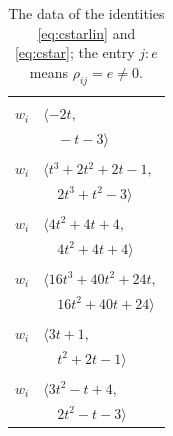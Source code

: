 \documentclass[11pt]{article}
\begin{document}
\begingroup\scriptsize
\setlength{\LTcapwidth}{\textwidth}
\begin{longtable}{@{}ll@{}}
\caption{The data of the identities \eqref{eq:cstarlin} and \eqref{eq:cstar}; the entry $j{:}e$ means $\rho_{ij}=e\neq0$.}\label{tab:cstar}\\
\hline\endfirsthead\hline\endhead\hline\endfoot
\multicolumn{2}{@{}p{0.97\textwidth}@{}}{$i=0$, $D_i=1$, $\rho_{ij}$: $22{:}2, \allowbreak 39{:}1, \allowbreak 40{:}1$}\\
$w_i$ & $\langle -2t,$\\
 & $\quad -t-3\rangle$\\
\addlinespace[2pt]
\multicolumn{2}{@{}p{0.97\textwidth}@{}}{$i=1$, $D_i=1$, $\rho_{ij}$: $21{:}1, \allowbreak 25{:}1, \allowbreak 26{:}2, \allowbreak 27{:}1, \allowbreak 37{:}2, \allowbreak 38{:}1, \allowbreak 42{:}1$}\\
$w_i$ & $\langle t^{3}+2t^{2}+2t-1,$\\
 & $\quad 2t^{3}+t^{2}-3\rangle$\\
\addlinespace[2pt]
\multicolumn{2}{@{}p{0.97\textwidth}@{}}{$i=2$, $D_i=1$, $\rho_{ij}$: $28{:}1, \allowbreak 35{:}1, \allowbreak 37{:}1, \allowbreak 38{:}1, \allowbreak 43{:}2, \allowbreak 46{:}2$}\\
$w_i$ & $\langle 4t^{2}+4t+4,$\\
 & $\quad 4t^{2}+4t+4\rangle$\\
\addlinespace[2pt]
\multicolumn{2}{@{}p{0.97\textwidth}@{}}{$i=3$, $D_i=1$, $\rho_{ij}$: $18{:}2, \allowbreak 31{:}2, \allowbreak 32{:}1, \allowbreak 38{:}1, \allowbreak 39{:}2, \allowbreak 40{:}2, \allowbreak 43{:}2, \allowbreak 44{:}2, \allowbreak 45{:}2$}\\
$w_i$ & $\langle 16t^{3}+40t^{2}+24t,$\\
 & $\quad 16t^{2}+40t+24\rangle$\\
\addlinespace[2pt]
\multicolumn{2}{@{}p{0.97\textwidth}@{}}{$i=4$, $D_i=1$, $\rho_{ij}$: $25{:}1, \allowbreak 30{:}2, \allowbreak 32{:}1, \allowbreak 37{:}1, \allowbreak 44{:}1$}\\
$w_i$ & $\langle 3t+1,$\\
 & $\quad t^{2}+2t-1\rangle$\\
\addlinespace[2pt]
\multicolumn{2}{@{}p{0.97\textwidth}@{}}{$i=5$, $D_i=1$, $\rho_{ij}$: $11{:}2, \allowbreak 34{:}2, \allowbreak 39{:}1, \allowbreak 41{:}2, \allowbreak 44{:}1$}\\
$w_i$ & $\langle 3t^{2}-t+4,$\\
 & $\quad 2t^{2}-t-3\rangle$\\

\end{longtable}
\end{document}
